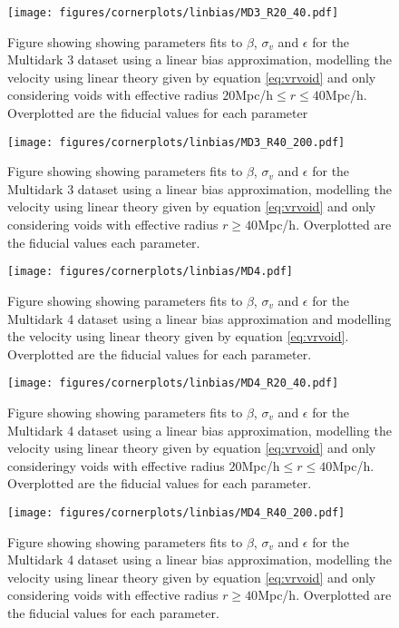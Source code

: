 \begin{figure}[htbp]
    \texttt{[image: figures/cornerplots/linbias/MD3\_R20\_40.pdf]}
    \caption{Figure showing showing parameters fits to $\beta$, $\sigma_v$ and $\epsilon$ for the Multidark 3 dataset using a linear bias approximation, modelling the velocity using linear theory given by equation \ref{eq:vrvoid} and only considering voids with effective radius $20$Mpc/h$\leq r \leq 40$Mpc/h. Overplotted are the fiducial values for each parameter}
    \label{fig:linbiasMD3R2040}
\end{figure}

\begin{figure}[htbp]
    \texttt{[image: figures/cornerplots/linbias/MD3\_R40\_200.pdf]}
    \caption{Figure showing showing parameters fits to $\beta$, $\sigma_v$ and $\epsilon$ for the Multidark 3 dataset using a linear bias approximation, modelling the velocity using linear theory given by equation \ref{eq:vrvoid} and only considering voids with effective radius $r\geq 40$Mpc/h. Overplotted are the fiducial values each parameter.}
    \label{fig:linbiasMD3R40}
\end{figure}

\begin{figure}[htbp]
    \texttt{[image: figures/cornerplots/linbias/MD4.pdf]}
    \caption{Figure showing showing parameters fits to $\beta$, $\sigma_v$ and $\epsilon$ for the Multidark 4 dataset using a linear bias approximation and  modelling the velocity using linear theory given by equation \ref{eq:vrvoid}.
    Overplotted are the fiducial values for each parameter.}
    \label{fig:linbiasMD4}
\end{figure}

\begin{figure}[htbp]
    \texttt{[image: figures/cornerplots/linbias/MD4\_R20\_40.pdf]}
    \caption{Figure showing showing parameters fits to $\beta$, $\sigma_v$ and $\epsilon$ for the Multidark 4 dataset using a linear bias approximation, modelling the velocity using linear theory given by equation \ref{eq:vrvoid} and only consideringy voids with effective radius $20$Mpc/h$\leq r \leq 40$Mpc/h. Overplotted are the fiducial values for each parameter.}
    \label{fig:linbiasMD4R2040}
\end{figure}

\begin{figure}[htbp]
    \texttt{[image: figures/cornerplots/linbias/MD4\_R40\_200.pdf]}
    \caption{Figure showing showing parameters fits to $\beta$, $\sigma_v$ and $\epsilon$ for the Multidark 4 dataset using a linear bias approximation, modelling the velocity using linear theory given by equation \ref{eq:vrvoid} and only considering voids with effective radius $r\geq 40$Mpc/h. Overplotted are the fiducial values for each parameter.}
    \label{fig:linbiasMD4R40}
\end{figure}
